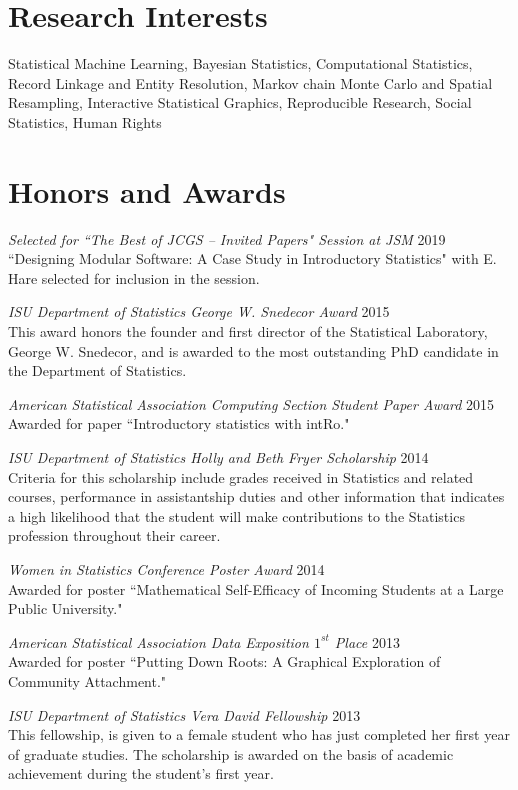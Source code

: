 \documentclass[margin,line]{res}
\begin{document}
\begin{resume}
\section{\sc Research Interests}
Statistical Machine Learning, Bayesian Statistics, Computational Statistics, Record Linkage and Entity Resolution,  Markov chain Monte Carlo and Spatial Resampling, Interactive Statistical Graphics, Reproducible Research, Social Statistics, Human Rights

\section{\sc Honors and Awards}
{\em Selected for ``The Best of JCGS -- Invited Papers" Session at JSM } \hfill 2019\\
``Designing Modular Software: A Case Study in Introductory Statistics" with E. Hare selected for inclusion in the session.

{\em ISU Department of Statistics George W. Snedecor Award } \hfill 2015\\
This award honors the founder and first director of the Statistical Laboratory, George W. Snedecor, and is awarded to the most outstanding PhD candidate in the Department of Statistics.

{\em American Statistical Association Computing Section Student Paper Award } \hfill 2015 \\
Awarded for paper ``Introductory statistics with intRo."

{\em ISU Department of Statistics Holly and Beth Fryer Scholarship } \hfill 2014\\
Criteria for this scholarship include grades received in Statistics and related courses, performance in assistantship duties and other information that indicates a high likelihood that the student will make contributions to the Statistics profession throughout their career.

{\em Women in Statistics Conference Poster Award } \hfill 2014\\
Awarded for poster ``Mathematical Self-Efficacy of Incoming Students at a Large Public University."

{\em American Statistical Association Data Exposition $1^{st}$ Place } \hfill 2013\\
Awarded for poster ``Putting Down Roots: A Graphical Exploration of Community Attachment."

{\em ISU Department of Statistics Vera David Fellowship } \hfill 2013\\
This fellowship, is given to a female student who has just completed her first year of graduate studies. The scholarship is awarded on the basis of academic achievement during the student’s first year.


\end{resume}
\end{document}
